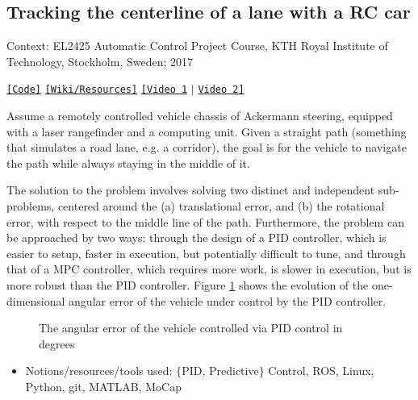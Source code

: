 \subsection{Tracking the centerline of a lane with a RC car}

Context: EL2425 Automatic Control Project Course, KTH Royal Institute of
Technology, Stockholm, Sweden; 2017

\noindent \href{https://github.com/li9i/HT16_P2_EL2425}{\texttt{[Code]}} \href{https://github.com/li9i/HT16_P2_EL2425_resources}{\texttt{[Wiki/Resources]}} \href{https://www.youtube.com/watch?v=w3Wnw5SLmss}{\texttt{[Video 1}} $|$ \href{https://youtu.be/937OZez1iN8?t=142}{\texttt{Video 2]}} \\

\begin{problem}
Assume a remotely controlled vehicle chassis of Ackermann
steering, equipped with a laser rangefinder and a computing unit. Given a
straight path (something that simulates a road lane, e.g. a corridor), the goal
is for the vehicle to navigate the path while always staying in the middle of it.
\end{problem}

The solution to the problem involves solving two distinct and independent
sub-problems, centered around the (a) translational error, and (b) the
rotational error, with respect to the middle line of the path. Furthermore, the
problem can be approached by two ways: through the design of a PID controller,
which is easier to setup, faster in execution, but potentially difficult to
tune, and through that of a MPC controller, which requires more work, is slower
in execution, but is more robust than the PID controller. Figure
\ref{fig:centerline_pid_error} shows the evolution of the one-dimensional
angular error of the vehicle under control by the PID controller.

\begin{figure}[H]\centering
  \scalebox{0.6}{}
  \caption{\small The angular error of the vehicle controlled via PID control
           in degrees}
  \label{fig:centerline_pid_error}
\end{figure}

\begin{itemize}
  \item Notions/resources/tools used: $\{$PID, Predictive$\}$ Control, ROS,  Linux, Python, git, MATLAB, MoCap
\end{itemize}

